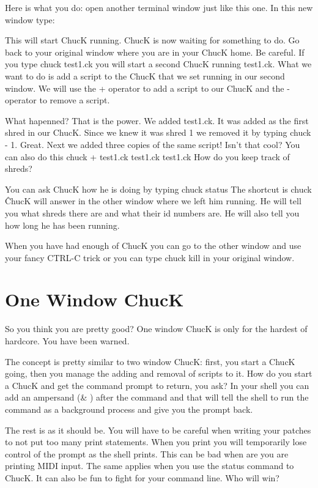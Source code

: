 Here is what you do: open another terminal window just like this one. In this new window type:

This will start ChucK running. ChucK is now waiting for something to do. Go back to your original window where you are in your ChucK home. Be careful. If you type chuck test1.ck you will start a second ChucK running test1.ck. What we want to do is add a script to the ChucK that we set running in our second window. We will use the + operator to add a script to our ChucK and the - operator to remove a script. 


What hapenned? That is the power. We added test1.ck. It was added as the first shred in our ChucK. Since we knew it was shred 1 we removed it by typing chuck - 1. Great. Next we added three copies of the same script! Isn't that cool? You can also do this chuck + test1.ck test1.ck test1.ck How do you keep track of shreds? 

You can ask ChucK how he is doing by typing chuck \doubledash status The shortcut is chuck \^ ChucK will answer in the other window where we left him running. He will tell you what shreds there are and what their id numbers are. He will also tell you how long he has been running. 

When you have had enough of ChucK you can go to the other window and use your fancy CTRL-C trick or you can type chuck \doubledash kill in your original window.   


\section*{One Window ChucK}

So you think you are pretty good? One window ChucK is only for the hardest of hardcore. You have been warned. 

The concept is pretty similar to two window ChucK: first, you start a ChucK going, then you manage the adding and removal of scripts to it. How do you start a ChucK and get the command prompt to return, you ask? In your shell you can add an ampersand (\& ) after the command and that will tell the shell to run the command as a background process and give you the prompt back. 


The rest is as it should be. You will have to be careful when writing your patches to not put too many print statements. When you print you will temporarily lose control of the prompt as the shell prints. This can be bad when are you are printing MIDI input. The same applies when you use the \doubledash status command to ChucK. It can also be fun to fight for your command line. Who will win?
